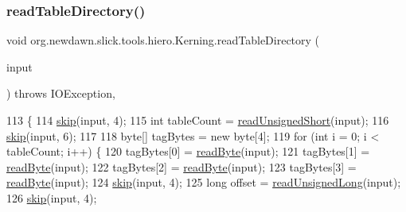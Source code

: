 \subsubsection{\texorpdfstring{read\+Table\+Directory()}{readTableDirectory()}}
{\footnotesize\ttfamily void org.\+newdawn.\+slick.\+tools.\+hiero.\+Kerning.\+read\+Table\+Directory (\begin{DoxyParamCaption}\item[{Input\+Stream}]{input }\end{DoxyParamCaption}) throws I\+O\+Exception\hspace{0.3cm}{\ttfamily [inline]}, {\ttfamily [private]}}


\begin{DoxyCode}
113                                                                            \{
114         \mbox{\hyperlink{classorg_1_1newdawn_1_1slick_1_1tools_1_1hiero_1_1_kerning_afa04157519725497f528b5bc175f1abb}{skip}}(input, 4);
115         \textcolor{keywordtype}{int} tableCount = \mbox{\hyperlink{classorg_1_1newdawn_1_1slick_1_1tools_1_1hiero_1_1_kerning_a8e409fe133f0b1741ba0c5a52ef13910}{readUnsignedShort}}(input);
116         \mbox{\hyperlink{classorg_1_1newdawn_1_1slick_1_1tools_1_1hiero_1_1_kerning_afa04157519725497f528b5bc175f1abb}{skip}}(input, 6);
117 
118         byte[] tagBytes = \textcolor{keyword}{new} byte[4];
119         \textcolor{keywordflow}{for} (\textcolor{keywordtype}{int} i = 0; i < tableCount; i++) \{
120             tagBytes[0] = \mbox{\hyperlink{classorg_1_1newdawn_1_1slick_1_1tools_1_1hiero_1_1_kerning_a226c7723ee9c8d6269c67b8e6ac45d13}{readByte}}(input);
121             tagBytes[1] = \mbox{\hyperlink{classorg_1_1newdawn_1_1slick_1_1tools_1_1hiero_1_1_kerning_a226c7723ee9c8d6269c67b8e6ac45d13}{readByte}}(input);
122             tagBytes[2] = \mbox{\hyperlink{classorg_1_1newdawn_1_1slick_1_1tools_1_1hiero_1_1_kerning_a226c7723ee9c8d6269c67b8e6ac45d13}{readByte}}(input);
123             tagBytes[3] = \mbox{\hyperlink{classorg_1_1newdawn_1_1slick_1_1tools_1_1hiero_1_1_kerning_a226c7723ee9c8d6269c67b8e6ac45d13}{readByte}}(input);
124             \mbox{\hyperlink{classorg_1_1newdawn_1_1slick_1_1tools_1_1hiero_1_1_kerning_afa04157519725497f528b5bc175f1abb}{skip}}(input, 4);
125             \textcolor{keywordtype}{long} offset = \mbox{\hyperlink{classorg_1_1newdawn_1_1slick_1_1tools_1_1hiero_1_1_kerning_aa3c458b9468029d2e7d2a1eccba11453}{readUnsignedLong}}(input);
126             \mbox{\hyperlink{classorg_1_1newdawn_1_1slick_1_1tools_1_1hiero_1_1_kerning_afa04157519725497f528b5bc175f1abb}{skip}}(input, 4);

\end{DoxyCode}

